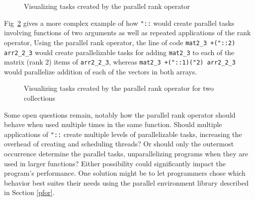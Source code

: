 \pagebreak


\begin{figure}[hptb]
\begin{quote}
\begin{singlespacing}
\begin{small}
\end{small}
\end{singlespacing}
\end{quote}
\caption{Visualizing tasks created by the parallel rank operator}
\label{fig::pr_tasks}
\end{figure}

Fig~\ref{fig::pr_tasks2} gives a more complex example of how \texttt{"::} would create parallel tasks  
involving functions of two arguments as well as repeated applications of the rank operator,
Using the parallel rank operator, the line of code
\texttt{mat2\_3 +("::2) arr2\_2\_3} would create parallelizable tasks for adding \texttt{mat2\_3} to 
each of the matrix (rank 2) items of \texttt{arr2\_2\_3}, 
whereas \texttt{mat2\_3 +("::1)("2) arr2\_2\_3} would parallelize addition 
of each of the vectors in both arrays.

\begin{figure}[p]
\begin{quote}
\begin{singlespacing}
\begin{small}
\end{small}
\end{singlespacing}
\end{quote}
\caption{Visualizing tasks created by the parallel rank operator for two collections}
\label{fig::pr_tasks2}
\end{figure}

Some open questions remain, notably 
how the parallel rank operator should behave when used multiple times in the same function.
Should multiple applications of \texttt{"::} create multiple levels of parallelizable tasks, 
increasing the overhead of creating and scheduling threads? 
Or should only the outermost occurrence determine the parallel tasks, 
unparallelizing programs when they are used in larger functions?
Either possibility could significantly impact the program's performance.
One solution might be to let programmers chose which behavior best suites their needs 
using the parallel environment library described in Section \ref{pfor}.

